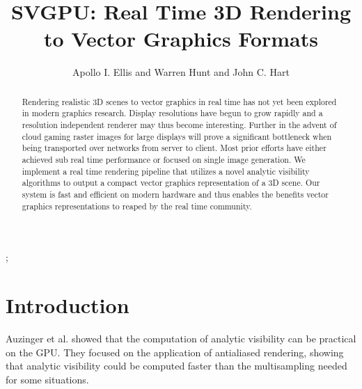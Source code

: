 \documentclass[review]{acmsiggraph}
\title{SVGPU: Real Time 3D Rendering to Vector Graphics Formats}
\author{Apollo I. Ellis and Warren Hunt and John C. Hart}
\begin{document}

 \teaser{
 }

\maketitle

\begin{abstract}

Rendering realistic 3D scenes to vector graphics in real time has not yet been explored in modern graphics research. Display resolutions have begun to grow rapidly and a resolution independent renderer may thus become interesting. Further in the advent of cloud gaming raster images for large displays will prove a significant bottleneck when being transported over networks from server to client.  Most prior efforts have either achieved sub real time performance or focused on single image generation. We implement a real time rendering pipeline that utilizes a novel analytic visibility algorithms to output a compact vector graphics representation of a 3D scene. Our system is fast and efficient on modern hardware and thus enables the benefits vector graphics representations to reaped by the real time community.

\end{abstract}

\begin{CRcatlist}
  ;
\end{CRcatlist}

\keywordlist


\copyrightspace

\section{Introduction}
Auzinger et al. \cite{auzinger2013} showed that the computation of analytic
visibility can be practical on the GPU. They focused on the application of
antialiased rendering, showing that analytic visibility could be computed
faster than the multisampling needed for some situations.
\end{document}
